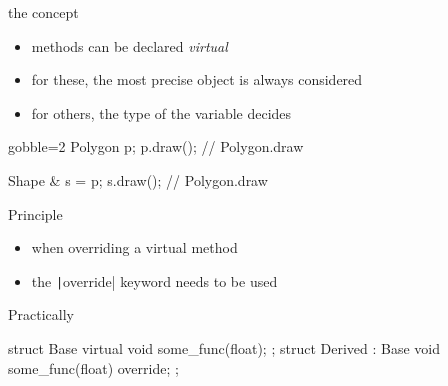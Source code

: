 \begin{frame}[fragile]
  \begin{block}{the concept}
    \begin{itemize}
    \item methods can be declared {\it virtual}
    \item for these, the most precise object is always considered
    \item for others, the type of the variable decides
    \end{itemize}
  \end{block}
  \begin{multicols}{2}
    \begin{cppcode*}{gobble=2}
      Polygon p;
      p.draw(); // Polygon.draw
      
      Shape & s = p;
      s.draw(); // Polygon.draw
    \end{cppcode*}
    \columnbreak
    \center
  \end{multicols}    
\end{frame}

\begin{frame}[fragile]
  \begin{block}{Principle}
    \begin{itemize}
    \item when overriding a virtual method
    \item the \texttt|override| keyword needs to be used
    \end{itemize}
  \end{block}
  \begin{exampleblock}{Practically}
    \begin{cppcode}
      struct Base {
        virtual void some_func(float);
      };
      struct Derived : Base {
        void some_func(float) override;
      };
    \end{cppcode}
  \end{exampleblock}
\end{frame}

